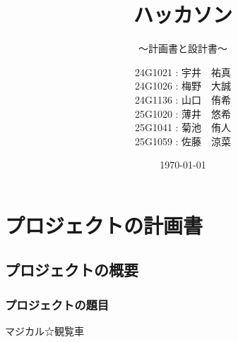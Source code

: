 \documentclass[lualatex,book,paper=a4paper,jafontsize=11.5pt,jafontscale=1.05]{jlreq}
\title{ハッカソン}
\subtitle{～計画書と設計書～}
\author{
        24G1021 : 宇井　祐真\\
        24G1026 : 梅野　大誠\\
        24G1136 : 山口　侑希\\
        25G1020 : 薄井　悠希\\
        25G1041 : 菊池　侑人\\
        25G1059 : 佐藤　涼菜 
}
\date{\today}
\begin{document}
\maketitle

\setcounter{tocdepth}{2}
\tableofcontents \thispagestyle{empty}

\chapter{プロジェクトの計画書} \label{chap:project-plan}\setcounter{page}{1}
\section{プロジェクトの概要}
\subsection{プロジェクトの題目}
マジカル☆観覧車
\end{document}
